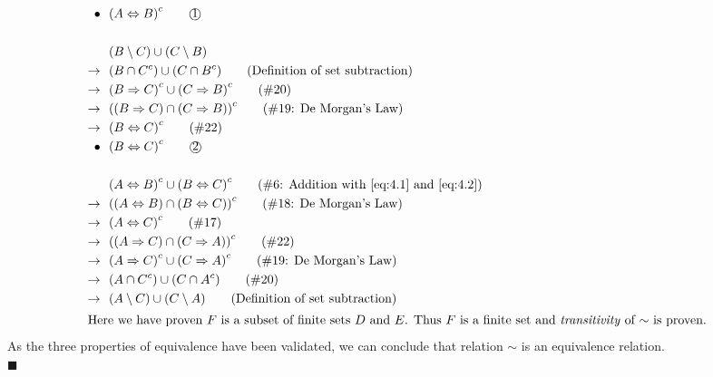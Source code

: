 \documentclass[12pt]{article}
\begin{document}
\begin{align*}
    \bullet\ \ & {(A \Leftrightarrow B)}^{c}                                      \tag*{\textcircled{1}} \label{eq:4.1} \\
  \\
    & (B \setminus C) \cup (C \setminus B) \\
    \rightarrow\ \ & (B \cap C^{c}) \cup (C \cap B^{c})                           \tag{Definition of set subtraction} \\
    \rightarrow\ \ & {(B \Rightarrow C)}^{c} \cup {(C \Rightarrow B)}^{c}         \tag{\#20} \\
    \rightarrow\ \ & {((B \Rightarrow C) \cap (C \Rightarrow B))}^{c}             \tag{\#19: De Morgan's Law} \\
  \rightarrow\ \ & {(B \Leftrightarrow C)}^{c}                                    \tag{\#22} \\
    \bullet\ \ & {(B \Leftrightarrow C)}^{c}                                      \tag*{\textcircled{2}} \label{eq:4.2} \\
  \\
    & {(A \Leftrightarrow B)}^{c} \cup {(B \Leftrightarrow C)}^{c}                \tag{\#6: Addition with\ \ref{eq:4.1} and\ \ref{eq:4.2}} \\
    \rightarrow\ \ & {((A \Leftrightarrow B) \cap (B \Leftrightarrow C))}^{c}     \tag{\#18: De Morgan's Law} \\
    \rightarrow\ \ & {(A \Leftrightarrow C)}^{c}                                  \tag{\#17} \\
    \rightarrow\ \ & {((A \Rightarrow C) \cap (C \Rightarrow A))}^{c}             \tag{\#22} \\
    \rightarrow\ \ & {(A \Rightarrow C)}^{c} \cup {(C \Rightarrow A)}^{c}         \tag{\#19: De Morgan's Law} \\
    \rightarrow\ \ & (A \cap C^{c}) \cup (C \cap A^{c})                           \tag{\#20} \\
    \rightarrow\ \ & (A \setminus C) \cup (C \setminus A)                        \tag{Definition of set subtraction} \\
  \intertext{Here we have proven $F$ is a subset of finite sets $D$ and $E$. Thus $F$ is a finite set and \textit{transitivity} of $\sim$ is proven.}
\end{align*}
As the three properties of equivalence have been validated, we can conclude that relation $\sim$ is an equivalence relation.
\\\null\hfill$\blacksquare$
\pagebreak
\end{document}
